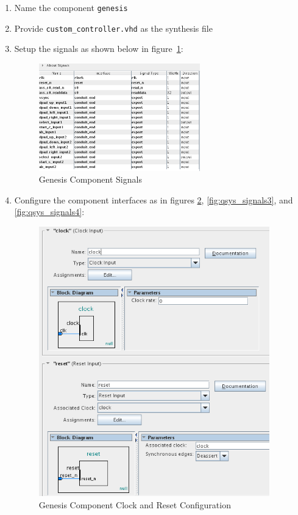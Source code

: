 \documentclass{capstonedoc}
\begin{document}
\begin{enumerate}
  \item Name the component \texttt{genesis}
  \item Provide \texttt{custom\_controller.vhd} as the synthesis file
  \item Setup the signals as shown below in figure~\ref{fig:qsys_signals}:

    \begin{figure}[h]
      \centering
      \includegraphics[width=7cm]{fig1}
      \caption{Genesis Component Signals}
      \label{fig:qsys_signals}
    \end{figure}

  \item Configure the component interfaces as in figures
    \ref{fig:qsys_signals2}, \ref{fig:qsys_signals3}, and
    \ref{fig:qsys_signals4}:

    \begin{figure}[h!]
      \centering
      \includegraphics[width=10cm]{fig2}
      \caption{Genesis Component Clock and Reset Configuration}
      \label{fig:qsys_signals2}
    \end{figure}


\end{enumerate}
\end{document}
